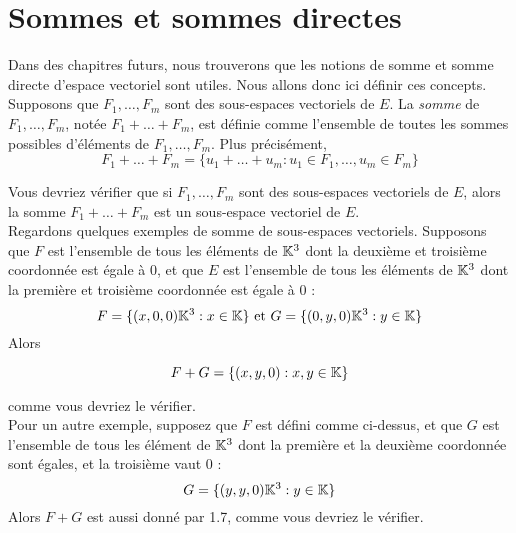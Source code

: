 \documentclass[12pt]{book}
\theoremstyle{plain}
\begin{document}
\section*{Sommes et sommes directes}
Dans des chapitres futurs, nous trouverons que les notions de somme et somme directe d'espace vectoriel sont utiles. Nous allons donc ici définir ces concepts.\\
\indent
Supposons que $F_1,\ldots,F_m$ sont des sous-espaces vectoriels de $E$. La \textit{somme} de $F_1,\ldots,F_m$, notée $F_1+\ldots+F_m$, est définie comme l'ensemble de toutes les sommes possibles d'éléments de $F_1,\ldots,F_m$. Plus précisément,
\begin{equation*}
    F_1+\ldots+F_m=\{u_1+\ldots+u_m:u_1\in F_1,\ldots,u_m\in F_m\}
\end{equation*}

Vous devriez vérifier que si $F_1,\ldots,F_m$ sont des sous-espaces vectoriels de $E$, alors la somme $F_1+\ldots+F_m$ est un sous-espace vectoriel de $E$. \\

Regardons quelques exemples de somme de sous-espaces vectoriels. Supposons que $F$ est l'ensemble de tous les éléments de $\mathbb{K}^3$ dont la deuxième et troisième coordonnée est égale à 0, et que $E$ est l'ensemble de tous les éléments de $\mathbb{K}^3$ dont la première et troisième coordonnée est égale à 0 :
\begin{equation*}
    F=\{(x,0,0)\mathbb{K}^3:x\in\mathbb{K}\} \textrm{~et~} G=\{(0,y,0)\mathbb{K}^3:y\in\mathbb{K}\}
\end{equation*}
Alors
\begin{prop}
    \begin{equation*}
        F+G=\{(x,y,0):x,y\in\mathbb{K}\}
    \end{equation*}
\end{prop}
comme vous devriez le vérifier.\\
\indent
Pour un autre exemple, supposez que $F$ est défini comme ci-dessus, et que $G$ est l'ensemble de tous les élément de $\mathbb{K}^3$ dont la première et la deuxième coordonnée sont égales, et la troisième vaut 0 :
\begin{equation*}
    G=\{(y,y,0)\mathbb{K}^3:y\in\mathbb{K}\}
\end{equation*}
Alors $F+G$ est aussi donné par 1.7, comme vous devriez le vérifier.\\
\end{document}
